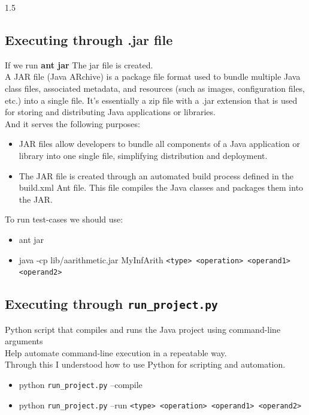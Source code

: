 \documentclass{article}
\begin{document}
\begin{spacing}{1.5}
{\subsection{Executing through .jar file}
 If we run \textbf{ant jar} The jar file is created.\\
 A JAR file (Java ARchive) is a package file format used to bundle multiple Java class files, associated metadata, and resources (such as images, configuration files, etc.) into a single file. It’s essentially a zip file with a .jar extension that is used for storing and distributing Java applications or libraries.\\
 And it serves the following purposes:
 \begin{itemize}
     \item JAR files allow developers to bundle all components of a Java application or library into one single file, simplifying distribution and deployment.
     \item The JAR file is created through an automated build process defined in the build.xml Ant file. This file compiles the Java classes and packages them into the JAR.
 \end{itemize}
 To run test-cases we should use:
 \begin{itemize}
     \item ant jar
     \item java -cp lib/aarithmetic.jar MyInfArith \texttt{<type> <operation> <operand1> <operand2>}
 \end{itemize}

\subsection{Executing through \texttt{run\_project.py}}
Python script that compiles and runs the Java project using command-line arguments\\
Help automate command-line execution in a repeatable way.\\
Through this I understood how to use Python for scripting and automation.
\begin{itemize}
    \item python \texttt{run\_project.py} --compile
    \item  python \texttt{run\_project.py} --run \texttt{<type> <operation> <operand1> <operand2>}
\end{itemize}


}
\end{spacing}
\end{document}
